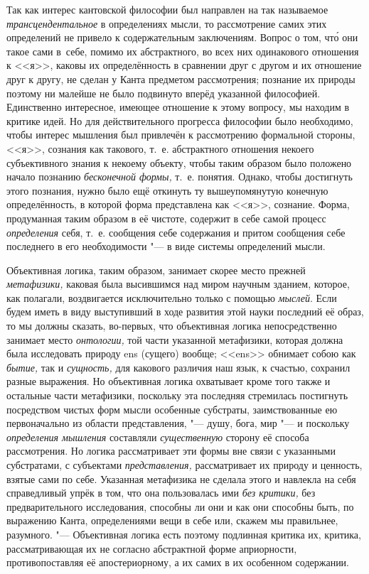 Так как интерес кантовской философии был направлен на так называемое
{\em трансцендентальное} в определениях мысли, то
рассмотрение самих этих определений не привело к содержательным
заключениям. Вопрос о том, чт\'{о} они такое сами в~себе, помимо их
абстрактного, во всех них одинакового отношения к <<я>>, каковы их
определённость в сравнении друг с другом и их отношение друг к другу, не
сделан у Канта предметом рассмотрения; познание их природы поэтому ни
малейше не было подвинуто вперёд указанной философией. Единственно
интересное, имеющее отношение к этому вопросу, мы находим в критике идей.
Но для действительного прогресса философии было необходимо, чтобы интерес
мышления был привлечён к рассмотрению формальной стороны, <<я>>, сознания как
такового, т.~е. абстрактного отношения некоего субъективного знания к
некоему объекту, чтобы таким образом было положено начало познанию
{\em бесконечной формы,} т.~е. понятия. Однако, чтобы
достигнуть этого познания, нужно было ещё откинуть ту вышеупомянутую
конечную определённость, в которой форма представлена как <<я>>, сознание.
Форма, продуманная таким образом в её чистоте, содержит в себе самой
процесс {\em определения} себя, т.~е. сообщения себе
содержания и притом сообщения себе последнего в его необходимости "--- в виде
системы определений мысли.

Объективная логика, таким образом, занимает скорее место прежней
{\em метафизики,} каковая была высившимся над миром
научным зданием, которое, как полагали, воздвигается исключительно только с
помощью {\em мыслей}. Если будем иметь в виду
выступивший в ходе развития этой науки последний её
образ,
то мы должны сказать, во-первых, что объективная логика непосредственно
занимает место {\em онтологии,} той части указанной
метафизики, которая должна была исследовать природу ens (сущего) вообще;
<<ens>> обнимает собою как {\em бытие,} так и
{\em сущность,} для какового различия наш язык, к
счастью, сохранил разные выражения. Но объективная логика охватывает кроме
того также и остальные части метафизики, поскольку эта последняя стремилась
постигнуть посредством чистых форм мысли особенные субстраты,
заимствованные ею первоначально из области представления, "--- душу, бога,
мир "--- и поскольку {\em определения мышления} составляли
{\em существенную} сторону её способа рассмотрения. Но
логика рассматривает эти формы вне связи с указанными субстратами, с
субъектами {\em представления,} рассматривает их
природу и ценность, взятые сами по себе. Указанная метафизика не сделала
этого и навлекла на себя справедливый упрёк в том, что она пользовалась ими
{\em без критики,} без предварительного исследования,
способны ли они и как они способны быть, по выражению Канта, определениями
вещи в себе или, скажем мы правильнее, разумного. "--- Объективная логика есть
поэтому подлинная критика их, критика, рассматривающая их не согласно
абстрактной форме априорности, противопоставляя её апостериорному, а их
самих в их особенном содержании.

